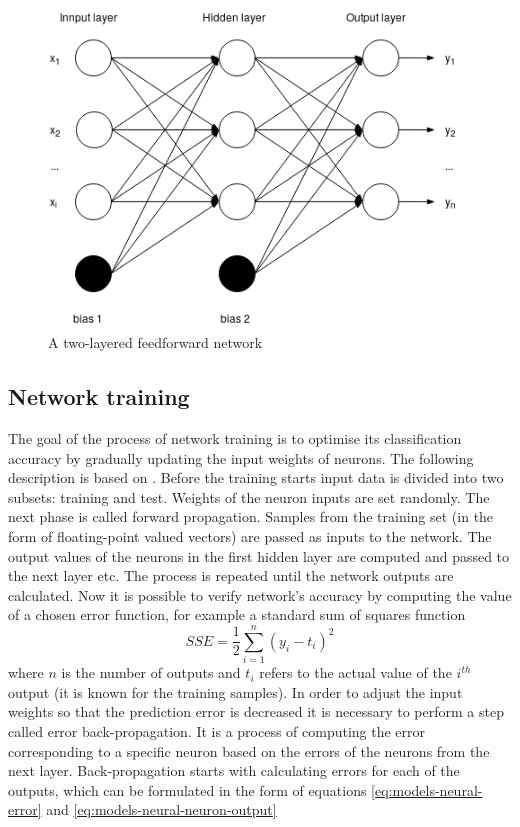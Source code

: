 \begin{figure}[htp]
\centering
\includegraphics[scale=0.6]{figures/models/feedforward-network.png}
\caption{A two-layered feedforward network}
\label{fig:models-feedforward-network}
\end{figure}

\subsection{Network training}\label{ssec:network-training}
The goal of the process of network training is to optimise its classification accuracy by gradually updating the input weights of neurons. The following description is based on \cite{HAN2005}.
Before the training starts input data is divided into two subsets: training and test. Weights of the neuron inputs are set randomly.
The next phase is called forward propagation. Samples from the training set (in the form of floating-point valued vectors) are passed as inputs to the network. The output values of the neurons in the first hidden layer are computed and passed to the next layer etc. The process is repeated until the network outputs are calculated.
Now it is possible to verify network's accuracy by computing the value of a chosen error function, for example a standard sum of squares function
\begin{equation}
SSE = \frac{1}{2}\sum_{i=1}^{n}(y_i - t_i)^2
\end{equation}
where $n$ is the number of outputs and $t_i$ refers to the actual value of the $i^{th}$ output (it is known for the training samples).
In order to adjust the input weights so that the prediction error is decreased it is necessary to perform a step called error back-propagation. It is a process of computing the error corresponding to a specific neuron based on the errors of the neurons from the next layer. Back-propagation starts with calculating errors for each of the outputs, which can be formulated in the form of equations \ref{eq:models-neural-error} and \ref{eq:models-neural-neuron-output}

